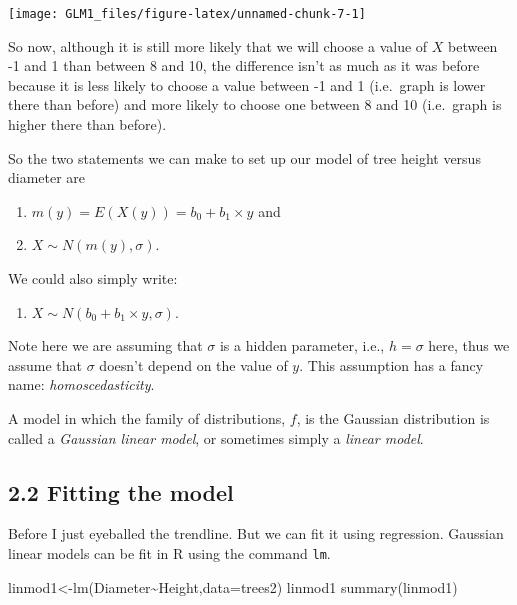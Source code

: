 \documentclass[
]{article}
\newenvironment{Shaded}{\begin{snugshade}}{\end{snugshade}}
\newcommand{\AttributeTok}[1]{\textcolor[rgb]{0.77,0.63,0.00}{#1}}
\newcommand{\FunctionTok}[1]{\textcolor[rgb]{0.00,0.00,0.00}{#1}}
\newcommand{\NormalTok}[1]{#1}
\newcommand{\OtherTok}[1]{\textcolor[rgb]{0.56,0.35,0.01}{#1}}
\newcommand{\SpecialCharTok}[1]{\textcolor[rgb]{0.00,0.00,0.00}{#1}}
\providecommand{\tightlist}{%
  \setlength{\itemsep}{0pt}\setlength{\parskip}{0pt}}
\begin{document}
\begin{center}\texttt{[image: GLM1\_files/figure-latex/unnamed-chunk-7-1]} \end{center}

So now, although it is still more likely that we will choose a value of
\(X\) between -1 and 1 than between 8 and 10, the difference isn't as
much as it was before because it is less likely to choose a value
between -1 and 1 (i.e.~graph is lower there than before) and more likely
to choose one between 8 and 10 (i.e.~graph is higher there than before).

So the two statements we can make to set up our model of tree height
versus diameter are

\begin{enumerate}
\def\labelenumi{\arabic{enumi}.}
\tightlist
\item
  \(m(y) = E(X(y)) = b_0 + b_1\times y\) and
\item
  \(X \sim N(m(y),\sigma)\).
\end{enumerate}

We could also simply write:

\begin{enumerate}
\def\labelenumi{\arabic{enumi}.}
\setcounter{enumi}{2}
\tightlist
\item
  \(X \sim N(b_0 +b_1\times y,\sigma)\).
\end{enumerate}

Note here we are assuming that \(\sigma\) is a hidden parameter, i.e.,
\(h=\sigma\) here, thus we assume that \(\sigma\) doesn't depend on the
value of \(y\). This assumption has a fancy name:
\emph{homoscedasticity}.

A model in which the family of distributions, \(f\), is the Gaussian
distribution is called a \emph{Gaussian linear model}, or sometimes
simply a \emph{linear model}.

\hypertarget{fitting-the-model}{%
\subsection{2.2 Fitting the model}\label{fitting-the-model}}

Before I just eyeballed the trendline. But we can fit it using
regression. Gaussian linear models can be fit in R using the command
\texttt{lm}.

\begin{Shaded}
\begin{Highlighting}[]
\NormalTok{linmod1}\OtherTok{\textless{}{-}}\FunctionTok{lm}\NormalTok{(Diameter}\SpecialCharTok{\textasciitilde{}}\NormalTok{Height,}\AttributeTok{data=}\NormalTok{trees2)}
\NormalTok{linmod1}
\FunctionTok{summary}\NormalTok{(linmod1)}
\end{Highlighting}
\end{Shaded}
\end{document}
